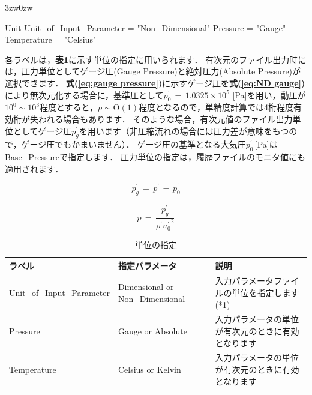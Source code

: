 \begin{indentation}{3zw}{0zw}

{\small
\begin{program}
  Unit {
    Unit_of_Input_Parameter = "Non_Dimensional"
    Pressure                = "Gauge"
    Temperature             = "Celsius"
  }
\end{program}
}

各ラベルは，\textbf{表\ref{tbl:param_unit}}に示す単位の指定に用いられます．
有次元のファイル出力時には，圧力単位としてゲージ圧(Gauge Pressure)と絶対圧力(Absolute Pressure)が選択できます．
\textbf{式(\ref{eq:gauge pressure})}に示すゲージ圧を\textbf{式(\ref{eq:ND gauge})}により無次元化する場合に，基準圧として$p_0^\prime\,=\,1.0325\times 10^5$ [Pa]を用い，動圧が$10^0 \sim 10^3$程度とすると，$p \sim \mathrm{O}(1)$程度となるので，単精度計算では4桁程度有効桁が失われる場合もあります．
そのような場合，有次元値のファイル出力単位としてゲージ圧$p_g^\prime$を用います（非圧縮流れの場合には圧力差が意味をもつので，ゲージ圧でもかまいません）．
ゲージ圧の基準となる大気圧$p_0^\prime\,$[Pa]は\hyperlink{tgt:reference}{Base\_Pressure}で指定します．
圧力単位の指定は，履歴ファイルのモニタ値にも適用されます．

\begin{equation}
p_g^\prime \,=\, p^\prime \,-\, p_0^\prime
\label{eq:gauge pressure}
\end{equation}

\begin{equation}
p \,=\, \frac{p_g^\prime}{\rho^\prime {u_0^\prime}^2}
\label{eq:ND gauge}
\end{equation}

\begin{table}[htdp]
\caption{単位の指定}
\begin{center}
\small
\begin{tabular}{lll} \toprule
ラベル & 指定パラメータ & 説明\\ \midrule
Unit\_of\_Input\_Parameter & Dimensional or Non\_Dimensional & 入力パラメータファイルの単位を指定します(*1)\\
Pressure & Gauge or Absolute & 入力パラメータの単位が有次元のときに有効となります\\
Temperature & Celsius or Kelvin & 入力パラメータの単位が有次元のときに有効となります\\\bottomrule
\end{tabular}
\end{center}
\label{tbl:param_unit}
\end{table}

\end{indentation}



